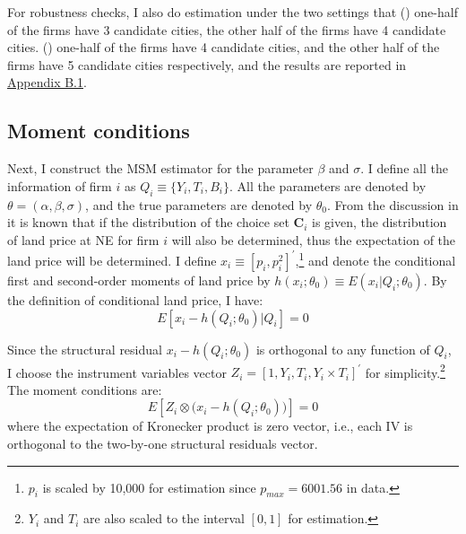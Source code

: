 For robustness checks, I also do estimation under the two settings
that () one-half of the firms have
3 candidate cities, the other half of the firms have 4 candidate cities.
() one-half of the firms have 4 candidate cities,
and the other half of the firms have 5 candidate cities
respectively, and the results are reported in
\hyperref[sec:robustness checks 1]{Appendix B.1}.


\subsection{Moment conditions}
Next, I construct the MSM estimator for the parameter $\beta$ and $\sigma$.
I define all the information of firm $i$ as $Q_i \equiv \{Y_i, T_i, B_i\}$.
All the parameters are denoted by $\theta = (\alpha, \beta, \sigma)$,
and the true parameters are denoted by $\theta_0$.
From the discussion in 
it is known that if the distribution of the choice set $\mathbf{C}_i$ is given, the distribution of
land price at NE for firm $i$ will also be determined,
thus the expectation of the land price will be
determined. I define $x_i \equiv [p_i, p_i^2]^{'}$,\footnote{
    $p_i$ is scaled by 10,000 for estimation since $p_{max}=6001.56$ in data.}
and denote the conditional first and second-order moments of land price
by $h(x_i; \theta_0) \equiv E(x_i|Q_i;\theta_0)$.
By the definition of conditional land price, I have:
\begin{equation}
    E[x_i - h(Q_i; \theta_0)|Q_i] = 0
\end{equation}

Since the structural residual $x_i - h(Q_i; \theta_0)$ is orthogonal to any function of $Q_i$,
I choose
the instrument variables vector $Z_i = [1, Y_i, T_i, Y_i \times T_i]^{\prime}$
for simplicity.\footnote{$Y_i$ and $T_i$ are also scaled to the interval $[0, 1]$ for estimation.}
The moment conditions are:
\begin{equation}
    E[Z_i \otimes \big(x_i - h(Q_i; \theta_0)\big)] = 0
\end{equation}
where the expectation of Kronecker product is zero vector, i.e., each IV is orthogonal
to the two-by-one structural residuals vector.

